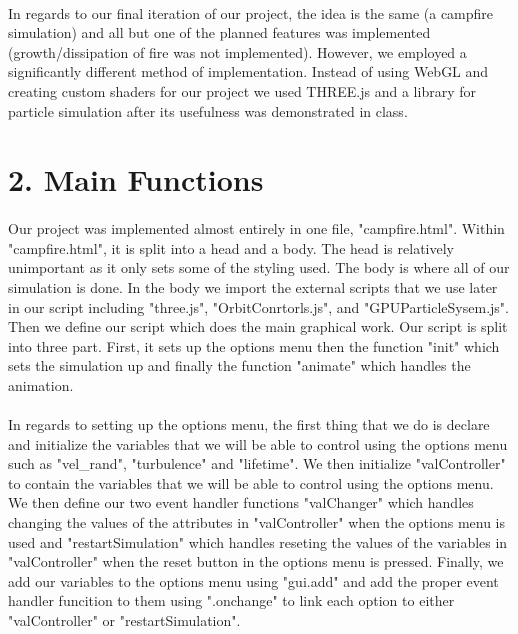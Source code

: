 \documentclass[letterpaper]{article}
\begin{document}
\paragraph{}    
    In regards to our final iteration of our project, the idea is the same (a campfire simulation) and all but one of the planned features was implemented (growth/dissipation of fire was not implemented). However, we employed a significantly different method of implementation. Instead of using WebGL and creating custom shaders for our project we used THREE.js and a library for particle simulation after its usefulness was demonstrated in class.
    

\section*{2. Main Functions}

\paragraph{}
    Our project was implemented almost entirely in one file, "campfire.html". Within "campfire.html", it is split into a head and a body. The head is relatively unimportant as it only sets some of the styling used. The body is where all of our simulation is done. In the body we import the external scripts that we use later in our script including "three.js", "OrbitConrtorls.js", and "GPUParticleSysem.js". Then we define our script which does the main graphical work. Our script is split into three part. First, it sets up the options menu then the function "init" which sets the simulation up and finally the function "animate" which handles the animation. 
\paragraph{}    
    In regards to setting up the options menu, the first thing that we do is declare and initialize the variables that we will be able to control using the options menu such as "vel\_rand", "turbulence" and "lifetime". We then initialize "valController" to contain the variables that we will be able to control using the options menu. We then define our two event handler functions "valChanger" which handles changing the values of the attributes in "valController" when the options menu is used and "restartSimulation" which handles reseting the values of the variables in "valController" when the reset button in the options menu is pressed. Finally, we add our variables to the options menu using "gui.add" and add the proper event handler funcition to them using ".onchange" to link each option to either "valController" or "restartSimulation".
\end{document}

